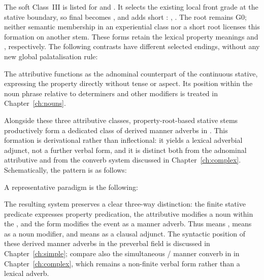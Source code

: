 The soft Class~III is listed for  and .
It selects the existing local front grade at the stative boundary, so final
 becomes , and adds short : ,
. The root remains G0; neither semantic membership in an
experiential class nor a short root licenses this formation on another stem.
These forms retain the lexical property meanings  and
, respectively. The following contrasts have different selected
endings, without any new global palatalisation rule:

\pex
\a {}
\a {}
\a {}
\a {}
\xe

\noindent The attributive functions as the adnominal counterpart of
the continuous stative, expressing the property directly without tense or
aspect. Its position within the noun phrase relative to determiners and other
modifiers is treated in Chapter~\ref{ch:nouns}.

Alongside these three attributive classes, property-root-based stative stems
productively form a dedicated class of derived manner adverbs in 
\label{sec:stative-adv}. This formation is derivational rather than
inflectional: it yields a lexical adverbial adjunct, not a further verbal
form, and it is distinct both from the adnominal attributive and from the
converb system discussed in Chapter~\ref{ch:complex}. Schematically, the
pattern is as follows:

\begin{center}
\end{center}

\noindent A representative paradigm is the following:

\pex
\a {} 
\a {} 
\a {}  
\a {} 
\xe

The resulting system preserves a clear three-way distinction: the finite stative
predicate expresses property predication, the attributive modifies a noun
within the , and the  form modifies the event as a manner
adverb. Thus  means ,  means 
as a noun modifier, and  means  as a clausal adjunct.
The syntactic position of these derived manner adverbs in the preverbal field is
discussed in Chapter~\ref{ch:simple}; compare also the simultaneous / manner
converb in  in Chapter~\ref{ch:complex}, which remains a non-finite
verbal form rather than a lexical adverb.

